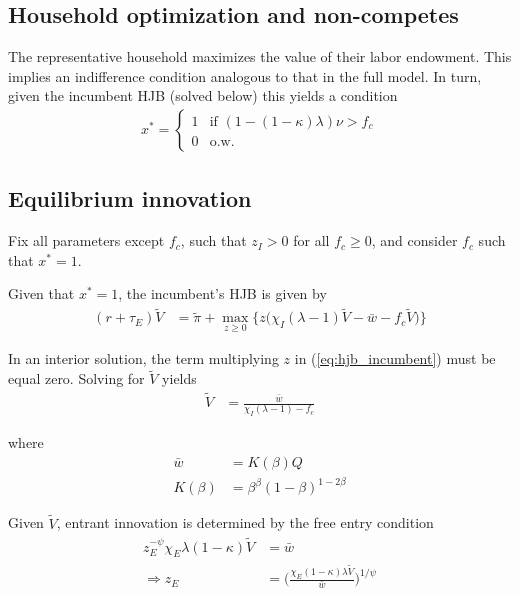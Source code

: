 \documentclass[12pt,english]{article}
\theoremstyle{remark}
\begin{document}
\subsection{Household optimization and non-competes}

The representative household maximizes the value of their labor endowment. This implies an indifference condition analogous to that in the full model. In turn, given the incumbent HJB (solved below) this yields a condition
\begin{align}
	x^* = \begin{cases}
		1 & \textrm{if } (1-(1-\kappa)\lambda)\nu > f_c\\
		0 & \textrm{o.w.}
	\end{cases}
\end{align}

\subsection{Equilibrium innovation}

Fix all parameters except $f_c$, such that $z_I > 0$ for all $f_c \ge 0$, and consider $f_c$ such that $x^* = 1$. 

Given that $x^* = 1$, the incumbent's HJB is given by 
\begin{align}
(r + \tau_E) \tilde{V} &= \tilde{\pi} + \max_{z \ge 0} \Big\{z \big(\chi_I (\lambda - 1) \tilde{V} - \bar{w} - f_c \tilde{V}\big) \Big\} \label{eq:hjb_incumbent}
\end{align}

In an interior solution, the term multiplying $z$ in (\ref{eq:hjb_incumbent}) must be equal zero. Solving for $\tilde{V}$ yields
\begin{align}
	\tilde{V} &= \frac{\bar{w}}{\chi_I(\lambda - 1) - f_c} \label{eq:hjb_incumbent_foc}
\end{align}

where 
\begin{align}
\bar{w} &= K(\beta) Q \label{eq:wage_prod}\\
K(\beta) &= \beta^{\beta}(1-\beta)^{1-2\beta} \label{eq:Kbeta}
\end{align}

Given $\tilde{V}$, entrant innovation is determined by the free entry condition
\begin{align}
	z_E^{-\psi} \chi_E \lambda (1-\kappa) \tilde{V} &= \bar{w}  \label{eq:free_entry}\\
	\Rightarrow z_E &= \Big( \frac{\chi_E (1-\kappa) \lambda \tilde{V}}{\bar{w}} \Big)^{1/\psi} \label{eq:effort_entrant}
\end{align}
\end{document}
